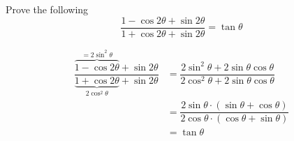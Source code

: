 

\question[2] Prove the following 
  \[ \dfrac{1-\cos 2\theta + \sin 2\theta}{1+\cos 2\theta + \sin 2\theta} = \tan\theta \]

\begin{solution}[\halfpage]
  \begin{align}
    \dfrac{\overbrace{1-\cos 2\theta}^{=2\sin^2\theta} + \sin 2\theta}
    {\underbrace{1+\cos 2\theta}_{2\cos^2\theta} + \sin 2\theta} &= 
    \dfrac{2\sin^2\theta + 2\sin\theta\cos\theta}{2\cos^2\theta + 2\sin\theta\cos\theta} \\
    &= \dfrac{2\sin\theta\cdot (\sin\theta + \cos\theta )}
    {2\cos\theta\cdot (\cos\theta + \sin\theta)} \\
    &= \tan\theta
  \end{align}
\end{solution}
